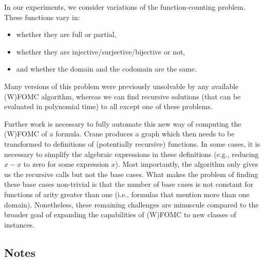 
In our experiments, we consider variations of the function-counting problem.
These functions vary in:
\begin{itemize}
  \item whether they are full or partial,
  \item whether they are injective/surjective/bijective or not,
  \item and whether the domain and the codomain are the same.
\end{itemize}
Many versions of this problem were previously unsolvable by any available
(W)FOMC algorithm, whereas we can find recursive solutions (that can be
evaluated in polynomial time) to all except one of these problems.


Further work is necessary to fully automate this new way of computing the
(W)FOMC of a formula. Crane produces a graph which then needs to be transformed
to definitions of (potentially recursive) functions. In some cases, it is
necessary to simplify the algebraic expressions in these definitions (e.g.,
reducing $x-x$ to zero for some expression $x$). Most importantly, the algorithm
only gives us the recursive calls but not the base cases. What makes the problem
of finding these base cases non-trivial is that the number of base cases is not
constant for functions of arity greater than one (i.e., formulas that mention
more than one domain). Nonetheless, these remaining challenges are minuscule
compared to the broader goal of expanding the capabilities of (W)FOMC to new
classes of instances.


\subsection{Notes}

